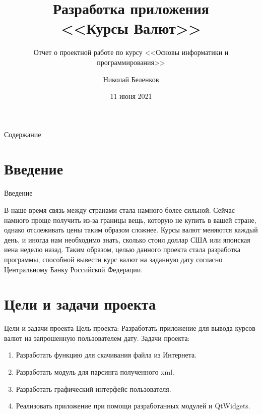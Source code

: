 \documentclass[aspectratio=169,xcolor=dvipsnames]{beamer}
\title[short title]{Разработка приложения \\ <<Курсы Валют>> }
\subtitle{Отчет о проектной работе по курсу <<Основы информатики и программирования>>}
\author[belenkov] {Николай Беленков}
\institute[NTU] %
{
    Институт Математики и Информационных Технологий \\
    Петрозаводский Государственный Университет
    \vskip 3pt
}
\date{11 июня 2021} %
\begin{document}

\lstset{escapechar=@,style=customc}

\begin{frame}
    \titlepage
    \end{frame}

\begin{frame}{Содержание}
    \tableofcontents
\end{frame}

\section{Введение}

\begin{frame}[fragile]{Введение}
\par В наше время связь между странами стала намного более сильной. Сейчас намного проще получить из-за границы вещь, которую не купить в вашей стране, однако отслеживать цены таким образом сложнее. Курсы валют меняются каждый день, и иногда нам необходимо знать, сколько стоил доллар США или японская иена неделю назад. Таким образом, целью данного проекта стала разработка программы, способной вывести курс валют на заданную дату согласно Центральному Банку Российской Федерации.

\end{frame}

\section{Цели и задачи проекта}
\begin{frame}[fragile]{Цели и задачи проекта}
Цель проекта: Разработать приложение для вывода курсов валют на запрошенную пользователем дату.
\newline\newline
Задачи проекта: 
\begin{enumerate} 
    \item Разработать функцию для скачивания файла из Интернета.
    \item Разработать модуль для парсинга полученного xml.
    \item Разработать графический интерфейс пользователя.
    \item Реализовать приложение при помощи разработанных модулей и QtWidgets.
\end{enumerate}
\end{frame}
\end{document}
